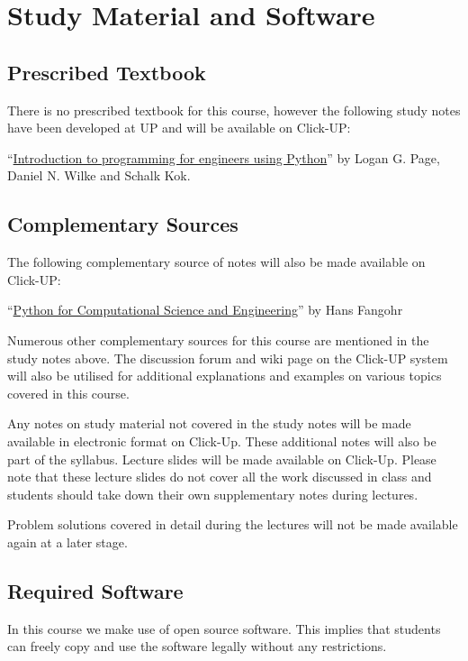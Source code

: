 \section{Study Material and Software}
    \subsection{Prescribed Textbook}
        There is no prescribed textbook for this course, however the following 
        study notes have been developed at UP and will be available on Click-UP:
        
        ``\underline{Introduction to programming for engineers using Python}'' by
        Logan G. Page, Daniel N. Wilke and Schalk Kok.
    
    \subsection{Complementary Sources}
        The following complementary source of notes will also be made available
        on Click-UP:
            
        ``\underline{Python for Computational Science and Engineering}'' by 
        Hans Fangohr
        
        Numerous other complementary sources for this course are mentioned in the 
        study notes above. The discussion forum and wiki page on the Click-UP 
        system will also be utilised for additional explanations and examples 
        on various topics covered in this course.
        
        Any notes on study material not covered in the study notes will be made 
        available in electronic format on Click-Up. These additional notes will also 
        be part of the syllabus. Lecture slides will be made available on 
        Click-Up. Please note that these lecture slides do not cover all the
        work discussed in class and students should take down their own 
        supplementary notes during lectures. 
        
        Problem solutions covered in detail during the lectures will not be 
        made available again at a later stage.


    \subsection{Required Software}
        In this course we make use of open source software. This implies
        that students can freely copy and use the software legally
        without any restrictions.

